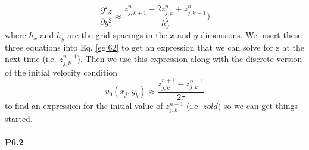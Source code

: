 \documentclass{book}
\theoremstyle{plain}
\theoremstyle{definition}
\numberwithin{exm}{chapter}
\theoremstyle{remark}
\theoremstyle{summary}
\theoremstyle{overview}
\begin{document}
\begin{equation}\label{eq:65}
\frac{\partial^2 z}{\partial y^2} \approx \frac{z^{n}_{j,k+1}-2z^n_{j,k}+z^{n}_{j,k-1}}{h^2_y} )
\end{equation}
where $h_x$ and $h_y$ are the grid spacings in the $x$ and $y$ dimensions. We insert these
three equations into Eq. \eqref{eg:62} to get an expression that we can solve for z at the
next time (i.e. $z^{n+1}_{j,k} $). Then we use this expression along with the discrete version
of the initial velocity condition
\begin{equation}\label{eq:66}
v_0(x_j,y_k)\approx \frac{z^{n+1}_{j,k}-z^{n-1}_{j,k}}{2\tau}
\end{equation}
to find an expression for the initial value of $z^{n-1}_{j,k}$ (i.e. $zold$) so we can get things
started.
\paragraph*{P6.2} 
\end{document}

